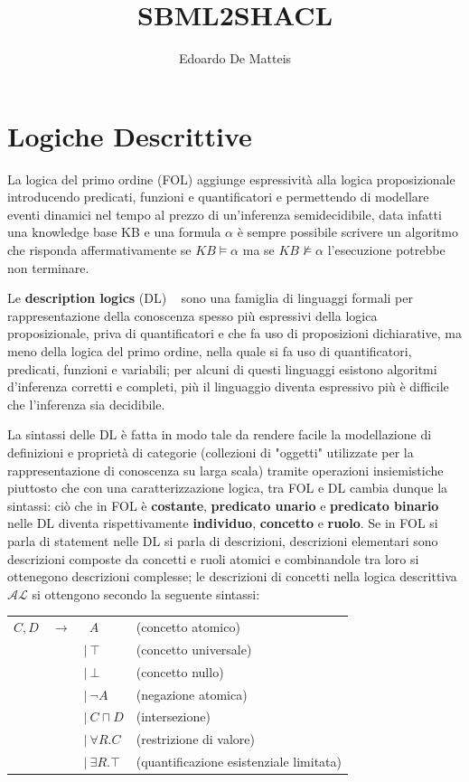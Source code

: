 \documentclass{article}
\title{SBML2SHACL}
\author{Edoardo De Matteis}
\begin{document}
\maketitle
\tableofcontents

\clearpage
\section{Logiche Descrittive} \label{sec:dl}
La logica del primo ordine (FOL) aggiunge espressività alla logica proposizionale introducendo predicati, funzioni e quantificatori e permettendo di modellare eventi dinamici nel tempo al prezzo di un'inferenza semidecidibile, data infatti una knowledge base KB e una formula $\alpha$ è sempre possibile scrivere un algoritmo che risponda affermativamente se $KB \models \alpha$ ma se $KB \nvDash \alpha$ l'esecuzione potrebbe non terminare. 

Le \textbf{description logics} (DL) ~\cite{dl:handbook} sono una famiglia di linguaggi formali per rappresentazione della conoscenza spesso più espressivi della logica proposizionale, priva di quantificatori e che fa uso di proposizioni dichiarative, ma meno della logica del primo ordine, nella quale si fa uso di quantificatori, predicati, funzioni e variabili; per alcuni di questi linguaggi esistono algoritmi d'inferenza corretti e completi, più il linguaggio diventa espressivo più è difficile che l'inferenza sia decidibile. 

La sintassi delle DL è fatta in modo tale da rendere facile la modellazione di definizioni e proprietà di categorie (collezioni di "oggetti" utilizzate per la rappresentazione di conoscenza su larga scala) tramite operazioni insiemistiche piuttosto che con una caratterizzazione logica, tra FOL e DL cambia dunque la sintassi: ciò che in FOL è \textbf{costante}, \textbf{predicato unario} e \textbf{predicato binario} nelle DL diventa rispettivamente \textbf{individuo}, \textbf{concetto} e \textbf{ruolo}. 
Se in FOL si parla di statement nelle DL si parla di descrizioni, descrizioni elementari sono descrizioni composte da concetti e ruoli atomici e combinandole tra loro si ottenegono descrizioni complesse; le descrizioni di concetti nella logica descrittiva $ \mathcal{AL} $ si ottengono secondo la seguente sintassi:

\begin{table}[h!] 
    \centering
    \begin{tabular}{r c l l}
        $ C, D $ & $ \rightarrow $ & $ \ \ A $ & (concetto atomico) \\
        & & $ | \ \top $ & (concetto universale) \\
        & & $ | \ \bot $ & (concetto nullo) \\
        & & $ | \ \neg A $ & (negazione atomica) \\
        & & $ | \ C \sqcap D $ & (intersezione) \\
        & & $ | \ \forall R.C $ & (restrizione di valore) \\
        & & $ | \ \exists R.\top $ & (quantificazione esistenziale limitata) \\
    \end{tabular}
\end{table}
\end{document}

